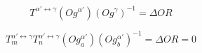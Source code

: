 $$T^{\alpha'\leftrightarrow\gamma}\left(Og^{\alpha'}\right)\left(Og^{\gamma}\right)^{-1} = \Delta OR \label{eq:1}$$

$$T_{m}^{\alpha'\leftrightarrow\gamma}T_{n}^{\alpha'\leftrightarrow\gamma}\left(Og_{a}^{\alpha'}\right)\left(Og_{b}^{\alpha'}\right)^{-1} = \Delta OR = 0 \label{eq:2}$$
